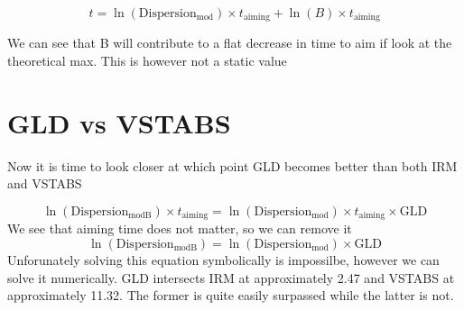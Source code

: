 \documentclass{article}
\begin{document}
\[t = \ln \left( \mathrm{Dispersion_{mod}} \right) \times t_{\mathrm{aiming}} + \ln \left( B \right) \times t_{\mathrm{aiming}} \]

We can see that B will contribute to a flat decrease in time to aim if look at the theoretical max.
This is however not a static value

\section{GLD vs VSTABS}
Now it is time to look closer at which point GLD becomes better than both IRM and VSTABS

\[ \ln \left(\mathrm{Dispersion_{modB}}\right) \times t_{\mathrm{aiming}} = \ln \left(\mathrm{Dispersion_{mod}}\right) \times t_{\mathrm{aiming}} \times \mathrm{GLD}\]
We see that aiming time does not matter, so we can remove it
\[ \ln \left(\mathrm{Dispersion_{modB}}\right) = \ln \left(\mathrm{Dispersion_{mod}}\right) \times \mathrm{GLD}\]
Unforunately solving this equation symbolically is impossilbe, however we can solve it numerically.
GLD intersects IRM at approximately 2.47 and VSTABS at approximately 11.32. The former is quite easily surpassed while the latter is not.
\end{document}
